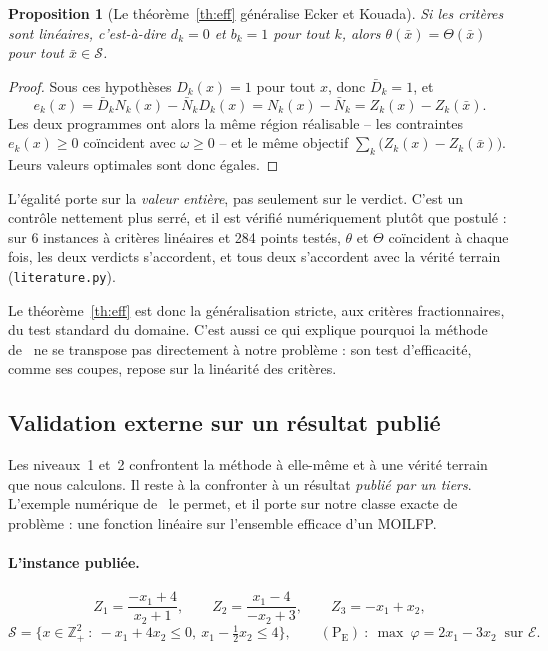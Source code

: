 \documentclass[11pt,a4paper]{article}
\theoremstyle{plain}
\newtheorem{proposition}{Proposition}
\theoremstyle{remark}
\newcommand{\Zk}{Z_k}
\newcommand{\Nk}{N_k}
\newcommand{\Dk}{D_k}
\newcommand{\Ecal}{\mathcal{E}}
\newcommand{\Scal}{\mathcal{S}}
\begin{document}
\begin{proposition}[Le théorème~\ref{th:eff} généralise Ecker et Kouada]
\label{prop:ecker}
Si les critères sont linéaires, c'est-à-dire $d_k=0$ et $b_k=1$ pour tout
$k$, alors $\theta(\bar x)=\Theta(\bar x)$ pour tout $\bar x\in\Scal$.
\end{proposition}

\begin{proof}
Sous ces hypothèses $\Dk(x)=1$ pour tout $x$, donc $\bar D_k=1$, et
\[
  e_k(x)=\bar D_k\Nk(x)-\bar N_k\Dk(x)=\Nk(x)-\bar N_k
        =\Zk(x)-\Zk(\bar x).
\]
Les deux programmes ont alors la même région réalisable -- les contraintes
$e_k(x)\ge 0$ coïncident avec $\omega\ge 0$ -- et le même objectif
$\sum_k\bigl(\Zk(x)-\Zk(\bar x)\bigr)$. Leurs valeurs optimales sont donc
égales.
\end{proof}

\noindent
L'égalité porte sur la \emph{valeur entière}, pas seulement sur le verdict.
C'est un contrôle nettement plus serré, et il est vérifié numériquement
plutôt que postulé : sur 6 instances à critères linéaires et 284 points
testés, $\theta$ et $\Theta$ coïncident à chaque fois, les deux verdicts
s'accordent, et tous deux s'accordent avec la vérité terrain
(\texttt{literature.py}).

Le théorème~\ref{th:eff} est donc la généralisation stricte, aux critères
fractionnaires, du test standard du domaine. C'est aussi ce qui explique
pourquoi la méthode de~\cite{drici2018} ne se transpose pas directement à
notre problème : son test d'efficacité, comme ses coupes, repose sur la
linéarité des critères.

\subsection{Validation externe sur un résultat publié}
\label{sec:externe}

Les niveaux~1 et~2 confrontent la méthode à elle-même et à une vérité terrain
que nous calculons. Il reste à la confronter à un résultat \emph{publié par
un tiers}. L'exemple numérique de~\cite[section~5]{zerdani2011} le permet, et
il porte sur notre classe exacte de problème : une fonction linéaire sur
l'ensemble efficace d'un MOILFP.

\paragraph{L'instance publiée.}
\[
  Z_1=\frac{-x_1+4}{x_2+1},\qquad
  Z_2=\frac{x_1-4}{-x_2+3},\qquad
  Z_3=-x_1+x_2,
\]
\[
  \Scal=\{x\in\mathbb{Z}^2_+\ :\ -x_1+4x_2\le 0,\ x_1-\tfrac{1}{2}x_2\le 4\},
  \qquad (\mathrm{P_E})\ :\ \max\ \varphi=2x_1-3x_2 \ \text{ sur } \Ecal .
\]
\end{document}

